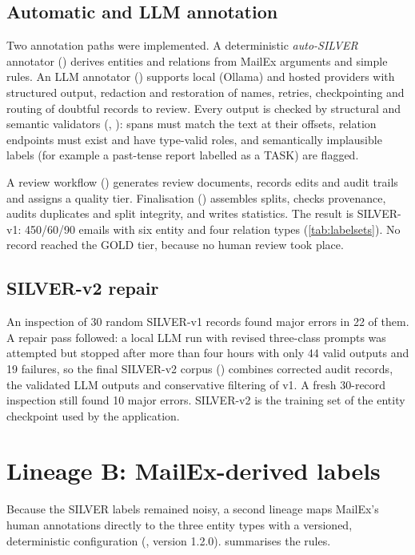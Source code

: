 \subsection{Automatic and LLM annotation}
Two annotation paths were implemented. A deterministic \emph{auto-SILVER} annotator () derives entities and relations from MailEx arguments and simple rules. An LLM annotator () supports local (Ollama) and hosted providers with structured output, redaction and restoration of names, retries, checkpointing and routing of doubtful records to review. Every output is checked by structural and semantic validators (, ): spans must match the text at their offsets, relation endpoints must exist and have type-valid roles, and semantically implausible labels (for example a past-tense report labelled as a TASK) are flagged.

A review workflow () generates review documents, records edits and audit trails and assigns a quality tier. Finalisation () assembles splits, checks provenance, audits duplicates and split integrity, and writes statistics. The result is SILVER-v1: 450/60/90 emails with six entity and four relation types (\cref{tab:labelsets}). No record reached the GOLD tier, because no human review took place.

\subsection{SILVER-v2 repair}
An inspection of 30 random SILVER-v1 records found major errors in 22 of them. A repair pass followed: a local LLM run with revised three-class prompts was attempted but stopped after more than four hours with only 44 valid outputs and 19 failures, so the final SILVER-v2 corpus () combines corrected audit records, the validated LLM outputs and conservative filtering of v1. A fresh 30-record inspection still found 10 major errors. SILVER-v2 is the training set of the entity checkpoint used by the application.

\section{Lineage B: MailEx-derived labels}
Because the SILVER labels remained noisy, a second lineage maps MailEx's human annotations directly to the three entity types with a versioned, deterministic configuration (, version 1.2.0).  summarises the rules.

